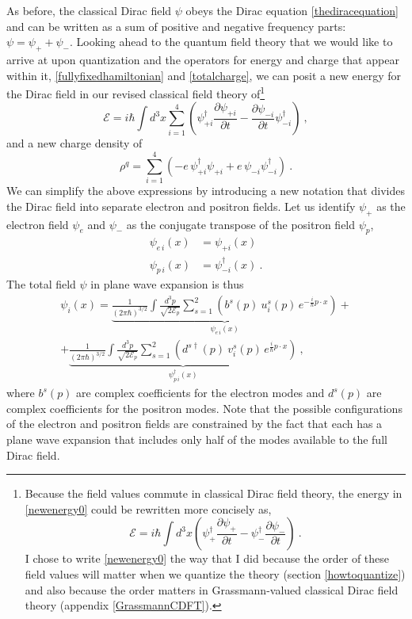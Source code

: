 \documentclass[12pt,secnumarabic,amsmath,amssymb,balancelastpage,nofootinbib]{article}
\begin{document}
As before, the classical Dirac field $\psi$ obeys the Dirac equation \eqref{thediracequation} and can be written as a sum of positive and negative frequency parts: $\psi=\psi_+ + \psi_-$.  Looking ahead to the quantum field theory that we would like to arrive at upon quantization and the operators for energy and charge that appear within it, \eqref{fullyfixedhamiltonian} and \eqref{totalcharge}, we can posit a new energy for the Dirac field in our revised classical field theory of\footnote{Because the field values commute in classical Dirac field theory, the energy in \eqref{newenergy0} could be rewritten more concisely as,
\begin{equation}
\mathcal{E}=i \hbar \int{d^3 x \left( \psi_+^\dagger\frac{\partial \psi_+}{\partial t} - \psi_-^\dagger\frac{\partial \psi_-}{\partial t}\right)}
\ .
\end{equation}
I chose to write \eqref{newenergy0} the way that I did because the order of these field values will matter when we quantize the theory (section \ref{howtoquantize}) and also because the order matters in Grassmann-valued classical Dirac field theory (appendix \ref{GrassmannCDFT}).} 
\begin{equation}
\mathcal{E}=i \hbar \int{d^3 x  \sum_{i=1}^4\left(\psi^{\dagger}_{+i}\frac{\partial \psi_{+i}}{\partial t}-\frac{\partial \psi_{-i}}{\partial t}\psi^{\dagger}_{-i} \right)}
\label{newenergy0}
\ ,
\end{equation}
and a new charge density of
\begin{equation}
\rho^q=\sum_{i=1}^4\left(-e\,\psi^{\dagger}_{+i} \psi_{+i}+e\,\psi_{-i}\psi^{\dagger}_{-i} \right)
\label{revisedchargedensity0}
\ .
\end{equation}
We can simplify the above expressions by introducing a new notation that divides the Dirac field into separate electron and positron fields.  Let us identify $\psi_+$ as the electron field $\psi_e$ and $\psi_-$ as the conjugate transpose of the positron field $\psi_p$,
\begin{align}
\psi_{e \, i}(x)&=\psi_{+ i}(x)
\nonumber
\\
\psi_{p \, i}(x)&=\psi^{\dagger}_{- i}(x)
\ .
\label{electronandpositronfields}
\end{align}
The total field $\psi$ in plane wave expansion is thus
\begin{multline}
\psi_i (x) =\underbrace{\frac{1}{(2\pi\hbar)^{3/2}}\int{ \frac{d^3 p}{\sqrt{2 \mathcal{E}_p}} \sum_{s=1}^2 \left(b^{s} (p) \: u_i^s (p) \, e^{-\frac{i}{\hbar} p \cdot x}\right)}}_{\mbox{$\psi_{e \, i}(x)$}}
+ \\
+ \underbrace{\frac{1}{(2\pi\hbar)^{3/2}}\int{ \frac{d^3 p}{\sqrt{2 \mathcal{E}_p}} \sum_{s=1}^2 \left(d^{s \dagger} (p) \: v_i^s (p) \,  e^{\frac{i}{\hbar} p \cdot x}\right)}}_{\mbox{$\psi^{\dagger}_{p \, i}(x)$}}
\ ,
\label{newplanewaveexpansion}
\end{multline}
where $b^{s} (p)$ are complex coefficients for the electron modes and $d^{s} (p)$ are complex coefficients for the positron modes.  Note that the possible configurations of the electron and positron fields are constrained by the fact that each has a plane wave expansion that includes only half of the modes available to the full Dirac field.
\end{document}
